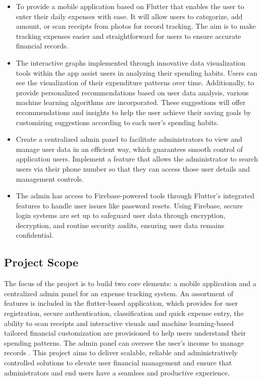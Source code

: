 \documentclass[12pt]{article}
\begin{document}
\vspace{0.5cm}

\normalsize
    \begin{itemize}
    \item To provide a mobile application based on Flutter that enables the user to enter their daily expenses with ease. It will allow users to categorize, add amount, or scan receipts from photos for record tracking. The aim is to make tracking expenses easier and straightforward for users to ensure accurate financial records\cite{johri2023expense}.
    
    \item The interactive graphs implemented through innovative data visualization tools within the app assist users in analyzing their spending habits. Users can see the visualization of their expenditure patterns over time. Additionally, to provide personalized recommendations based on user data analysis, various machine learning algorithms are incorporated. These suggestions will offer recommendations and insights to help the user achieve their saving goals by customizing suggestions according to each user’s spending habits.
   \newpage  
    \item Create a centralized admin panel to facilitate administrators to view and manage user data in an efficient way, which guarantees smooth control of application users. 
    Implement a feature that allows the administrator to search users via their phone number so that they can access those user details and management controls.
    
    \item The admin has access to Firebase-powered tools through Flutter's integrated features to handle user issues like password resets. Using Firebase, secure login systems are set up to safeguard user data through encryption, decryption, and routine security audits, ensuring user data remains confidential.
\end{itemize}

\vspace{1cm}

\noindent
\subsection{Project Scope}

\vspace{0.5cm}

\normalsize
\noindent The focus of the project is to build two core elements: a mobile application and a centralized admin panel for an expense tracking system. An assortment of features is included in the flutter-based application, which provides for user registration, secure authentication, classification and quick expense entry, the ability to scan receipts and interactive visuals and machine learning-based tailored financial customization are provisioned to help users understand their spending patterns. The admin panel can oversee the user's income to manage records . This project aims to deliver scalable, reliable and administratively controlled solutions to elevate user financial management and ensure that administrators and end users have a seamless and productive experience.
\end{document}
